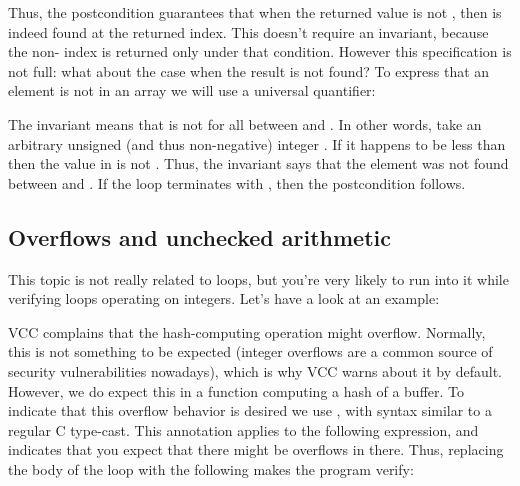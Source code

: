 {{\noindent
Thus, the postcondition guarantees that when the returned value
is not , then  is indeed found at the returned
index.
This doesn't require an invariant, because the non- index
is returned only under that condition.
However this specification is not full: what about the case when the result is not found?
To express that an element is not in an array we will use a universal quantifier:


\noindent
The invariant  means that 
 is not  for all  between  and .
In other words, take an arbitrary unsigned (and thus non-negative) integer . 
If it happens to be less than  then the value in  is not .
Thus, the invariant says that the element was not found between 
and .
If the loop terminates with , then the postcondition follows.

\subsection{Overflows and unchecked arithmetic}
\label{sect:overflows}

This topic is not really related to loops, but you're very likely to run into it
while verifying loops operating on integers.
Let's have a look at an example:


\noindent
VCC complains that the hash-computing operation might overflow.
Normally, this is not something to be expected (integer overflows
are a common source of security vulnerabilities nowadays),
which is why VCC warns about it by default.
However, we do expect this in a function computing a hash of a buffer.
To indicate that this overflow behavior is desired we use ,
with syntax similar to a regular C type-cast.
This annotation applies to the following expression, and indicates that
you expect that there might be overflows in there.
Thus, replacing the body of the loop with the following
makes the program verify:


}}
